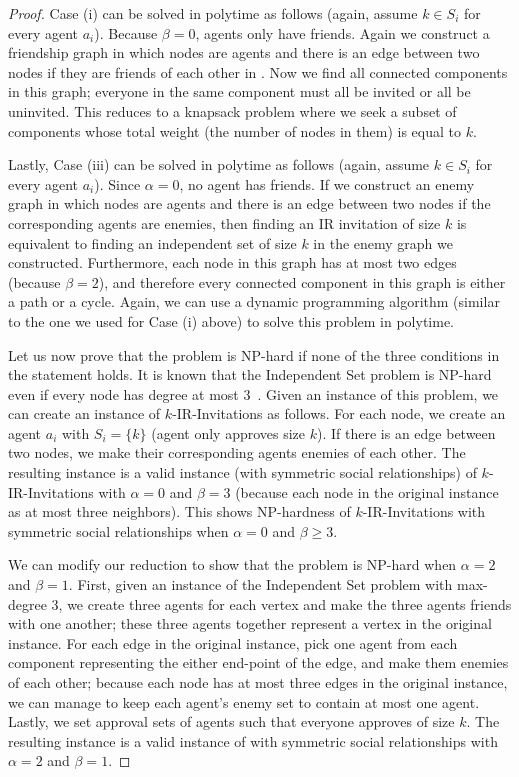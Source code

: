 \begin{proof}
 	Case (i) can be solved in polytime as follows (again, assume $k \in S_i$ for every agent $a_i$). Because $\beta = 0$, agents only have friends. Again we construct a friendship graph in which nodes are agents and there is an edge between two nodes if they are friends of each other in \SIP. Now we find all connected components in this graph; everyone in the same component must all be invited or all be uninvited. This reduces to a knapsack problem where we seek a subset of components whose total weight (the number of nodes in them) is equal to $k$. 

	Lastly, Case (iii) can be solved in polytime as follows (again, assume $k \in S_i$ for every agent $a_i$).
	Since $\alpha = 0$, no agent has friends. If we construct an enemy graph in which nodes are agents and there is an edge between two nodes if the corresponding agents are enemies, then finding an IR invitation of size $k$ is equivalent to finding an independent set of size $k$ in the enemy graph we constructed. Furthermore, each node in this graph has at most two edges (because $\beta = 2$), and therefore every connected component in this graph is either a path or a cycle. Again, we can use a dynamic programming algorithm (similar to the one we used for Case (i) above) to solve this problem in polytime.

		
	Let us now prove that the problem is NP-hard if none of the three conditions in the statement holds. 
	It is known that the Independent Set problem is NP-hard even if every node has degree at most 3~\cite{Garey_Max_Is_Cubic}. 
	Given an instance of this problem, we can create an instance of $k$-IR-Invitations as follows. 
	For each node, we create an agent $a_i$ with $S_i =\{k\}$ (agent only approves size $k$). 
	If there is an edge between two nodes, we make their corresponding agents enemies of each other. 
	The resulting instance is a valid instance (with symmetric social relationships) of $k$-IR-Invitations with $\alpha = 0$ and $\beta = 3$ (because each node in the original instance as at most three neighbors). 
	This shows NP-hardness of $k$-IR-Invitations with symmetric social relationships when $\alpha = 0$ and $\beta \geq 3$.	
	
	We can modify our reduction to show that the problem is NP-hard when $\alpha = 2$ and $\beta = 1$.
	First, given an instance of the Independent Set problem with max-degree 3, we create three agents for each vertex and make the three agents friends with one another; these three agents together represent a vertex in the original instance.
	For each edge in the original instance, pick one agent from each component representing the either end-point of the edge, and make them enemies of each other; because each node has at most three edges in the original instance, we can manage to keep each agent's enemy set to contain at most one agent. Lastly, we set approval sets of agents such that everyone approves of size $k$. The resulting instance is a valid instance of \SIPs with symmetric social relationships with $\alpha = 2$ and $\beta = 1$. 
	

\end{proof}
